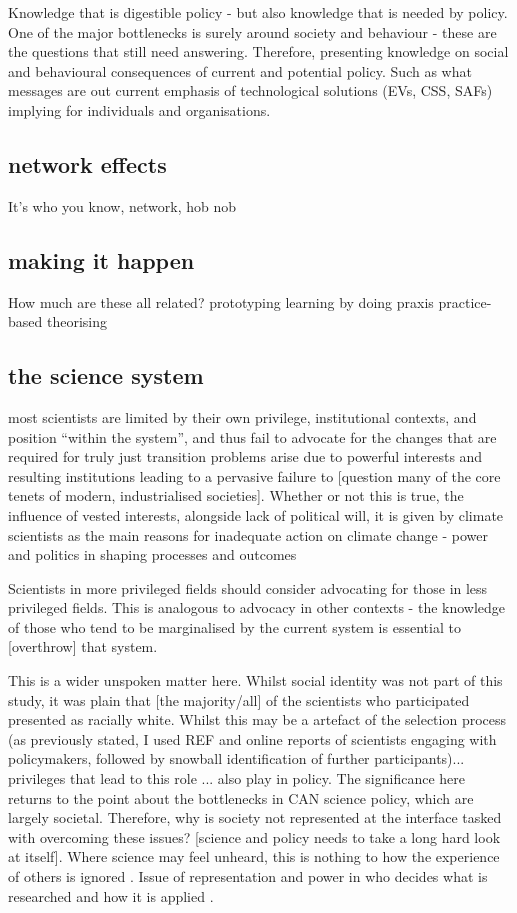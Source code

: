 Knowledge that is digestible policy - but also knowledge that is needed by policy. One of the major bottlenecks is surely around society and behaviour - these are the questions that still need answering. Therefore, presenting knowledge on social and behavioural consequences of current and potential policy. Such as what messages are out current emphasis of technological solutions (EVs, CSS, SAFs) implying for individuals and organisations.

\subsection{network effects}
It's who you know, network, hob nob

\subsection{making it happen}
How much are these all related?
prototyping
learning by doing
praxis
practice-based theorising

\subsection{the science system}
\cite{Bendell2024} most scientists are limited by their own privilege, institutional contexts, and position ``within the system'', and thus fail to advocate for the changes that are required for truly just transition  
\cite{StoddardEtAl2021} problems arise due to powerful interests and resulting institutions leading to a pervasive failure to [question many of the core tenets of modern, industrialised societies]. Whether or not this is true, the influence of vested interests, alongside lack of political will, it is given by climate scientists as the main reasons for inadequate action on climate change \cite{Carrington2024} 
\cite{TurnhoutMWKL2020} - power and politics in shaping processes and outcomes

Scientists in more privileged fields should consider advocating for those in less privileged fields. This is analogous to advocacy in other contexts - the knowledge of those who tend to be marginalised by the current system is essential to [overthrow] that system.

This is a wider unspoken matter here. Whilst social identity was not part of this study, it was plain that [the majority/all] of the scientists who participated presented as racially white. Whilst this may be a artefact of the selection process (as previously stated, I used REF and online reports of scientists engaging with policymakers, followed by snowball identification of further participants)... privileges that lead to this role ... also play in policy. The significance here returns to the point about the bottlenecks in CAN science policy, which are largely societal. Therefore, why is society not represented at the interface tasked with overcoming these issues? [science and policy needs to take a long hard look at itself]. Where science may feel unheard, this is nothing to how the experience of others is ignored \cite{IbarraJOBCIMRS2022}. Issue of representation and power in who decides what is researched and how it is applied \cite{McNiePS2017}.

